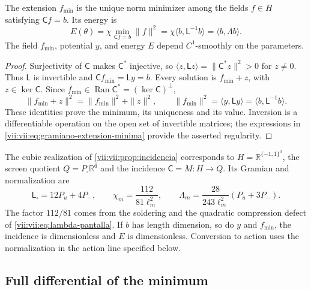 \begin{proposition}
\label{vii:vii:prop:minimo-parametrizado}
The extension \(f_{\min}\) is the unique norm minimizer among the fields \(f\in H\) satisfying \(\mathsf C f=b\). Its energy is
\begin{equation}
 E(\theta)=\chi\min_{\mathsf C f=b}\|f\|^2
 =\chi\langle b,\mathsf L^{-1}b\rangle
 =\langle b,\Lambda b\rangle.
 \label{vii:vii:eq:energia-extension-minima}
\end{equation}
The field \(f_{\min}\), potential \(y\), and energy \(E\)
depend \(C^1\)-smoothly on the parameters.
\end{proposition}

\begin{proof}
Surjectivity of \(\mathsf C\) makes \(\mathsf C^*\) injective,
so \(\langle z,\mathsf Lz\rangle=\|\mathsf C^*z\|^2>0\)
for \(z\ne0\). Thus \(\mathsf L\) is invertible and
\(\mathsf C f_{\min}=\mathsf L y=b\). Every solution is
\(f_{\min}+z\), with \(z\in\ker\mathsf C\). Since
\(f_{\min}\in\operatorname{Ran}\mathsf C^*=(\ker\mathsf C)^\perp\),
\[
 \|f_{\min}+z\|^2=\|f_{\min}\|^2+\|z\|^2,
 \qquad
 \|f_{\min}\|^2=\langle y,\mathsf L y\rangle
 =\langle b,\mathsf L^{-1}b\rangle.
\]
These identities prove the minimum, its uniqueness and its value. Inversion is a differentiable operation on the open set of invertible matrices; the expressions in \eqref{vii:vii:eq:gramiano-extension-minima} provide the asserted regularity.
\end{proof}

The cubic realization of \ref{vii:vii:prop:incidencia} corresponds to \(H=\mathbb R^{\{-1,1\}^3}\), the screen quotient \(Q=P_\square\mathbb R^6\) and the incidence \(\mathsf C=M:H\to Q\). Its Gramian and normalization are
\begin{equation}
 \mathsf L_\square=12P_u+4P_-,\qquad
 \chi_m=\frac{112}{81\ell_m^2},\qquad
 \Lambda_m=\frac{28}{243\ell_m^2}(P_u+3P_-).
 \label{vii:vii:eq:normalizacion-minimo-cubico}
\end{equation}
The factor \(112/81\) comes from the soldering and the quadratic compression defect of \eqref{vii:vii:eq:lambda-pantalla}. If \(b\) has length dimension, so do \(y\) and \(f_{\min}\), the incidence is dimensionless and \(E\) is dimensionless. Conversion to action uses the normalization in the action line specified below.

\subsection{Full differential of the minimum}
\label{vii:vii:subsec:diferencial-minimo}

